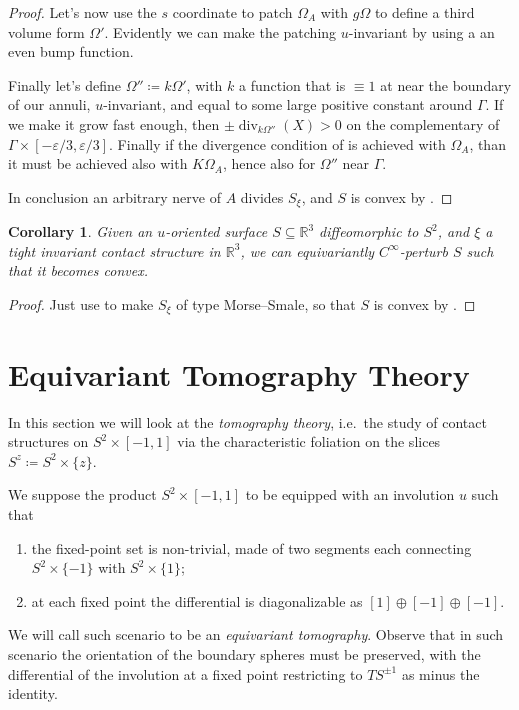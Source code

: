 \documentclass[a4paper, 11pt]{amsart}
\theoremstyle{plain}
\newtheorem{cor}[cor]{Corollary}
\theoremstyle{definition}
\newcommand{\R}{\mathbb{R}}
\renewcommand{\epsilon}{\varepsilon}
\DeclareMathOperator{\diver}{div}
\begin{document}
\begin{proof}
	Let's now use the $s$ coordinate to patch $\Omega_A$ with $g\Omega$ to define a third volume form $\Omega'$. Evidently we can make the patching $u$-invariant by using a an even bump function.
	
	
	 Finally let's define $\Omega'' \coloneqq k\Omega'$, with $k$ a function that is $\equiv 1$ at near the boundary of our annuli, $u$-invariant, and equal to some large positive constant around $\Gamma$. If we make it grow fast enough, then $\pm\diver_{k\Omega''}(X) > 0$ on the complementary of $\Gamma \times [-\epsilon/3, \epsilon/3]$. Finally if the divergence condition of  is achieved with $\Omega_A$, than it must be achieved also with $K\Omega_A$, hence also for $\Omega''$ near $\Gamma$.
	
	
	In conclusion an arbitrary nerve of $A$ divides $S_\xi$, and $S$ is convex by .
\end{proof}
\begin{cor}\label{Cinftyconvex}
	Given an $u$-oriented surface $S \subseteq \R^3$ diffeomorphic to $S^2$, and $\xi$ a tight invariant contact structure in $\R^3$, we can equivariantly $C^\infty$-perturb $S$ such that it becomes convex.
\end{cor}
\begin{proof}
	Just use  to make $S_\xi$ of type Morse--Smale, so that $S$ is convex by .
\end{proof}
\section{Equivariant Tomography Theory}\label{sec:tomography}

In this section we will look at the \emph{tomography theory}, i.e.\ the study of contact structures on $S^2 \times [-1,1]$ via the characteristic foliation on the slices $S^z \coloneqq S^2 \times \{z\}$.

We suppose the product $S^2 \times [-1,1]$ to be equipped with an involution $u$ such that
\begin{enumerate}
	\item the fixed-point set is non-trivial, made of two segments each connecting $S^2 \times \{-1\}$ with $S^2 \times \{1\}$;
	\item at each fixed point the differential is diagonalizable as $[1] \oplus [-1]\oplus[-1]$.
\end{enumerate}
We will call such scenario to be an \emph{equivariant tomography}. Observe that in such scenario the orientation of the boundary spheres must be preserved, with the differential of the involution at a fixed point restricting to $TS^{\pm1}$ as minus the identity.
\end{document}
